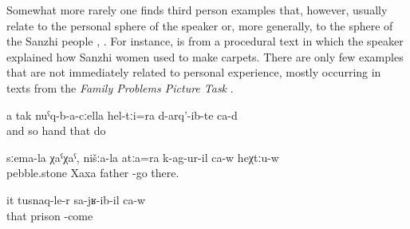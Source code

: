 Somewhat more rarely one finds third person examples that, however, usually relate to the personal sphere of the speaker or, more generally, to the sphere of the Sanzhi people , . For instance,  is from a procedural text in which the speaker explained how Sanzhi women used to make carpets. There are only few examples that are not immediately related to personal experience, mostly occurring in texts from the \textit{Family Problems Picture Task} \citep{SanRoqueEtAl2012} .
%
\begin{exe}
	\ex	\label{ex:And like this with the hands (they) also made them analytic}
	\gll	a	tak	nuˁq-b-a-cːella	hel-tːi=ra	d-arq'-ib-te	ca-d\\
		and	so	hand	that	do 	\\
	\glt	{}

	\ex	\label{ex:‎Semalla Xaxa (place name). Our father also fell down there}
	\gll	sːema-la	χaˁχaˁ,	nišːa-la	atːa=ra	k-ag-ur-il ca-w	heχtːu-w\\
		pebble.stone	Xaxa		father	-go		there.\\
	\glt	{}

	\ex	\label{ex:‎He came back from prison analytic}
	\gll	it	tusnaq-le-r	sa-jʁ-ib-il	ca-w\\
		that	prison	-come \\
	\glt	{}
\end{exe}


